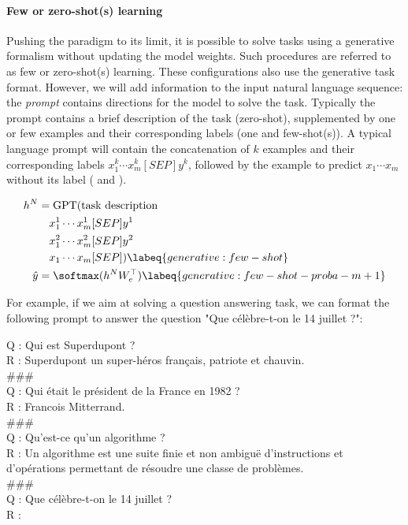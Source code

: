 \paragraph{Few or zero-shot(s) learning} Pushing the paradigm to its limit, it is possible to solve tasks using a generative formalism without updating the model weights. Such procedures are referred to as few or zero-shot(s) learning. These configurations also use the generative task format. However, we will add information to the input natural language sequence: the \textit{prompt} contains directions for the model to solve the task. Typically the prompt contains a brief description of the task (zero-shot), supplemented by one or few examples and their corresponding labels (one and few-shot(s)). A typical language prompt will contain the concatenation of $k$ examples and their corresponding labels $x^k_1 \cdots x^k_m [SEP] y^k$, followed by the example to predict $x_1 \cdots x_m$ without its label ( and ).

\begin{align}
    h^N &= \textrm{GPT}(\textrm{task description} \nonumber \\
    & \quad x^1_1 \cdots x^1_m [SEP] y^1 \nonumber \\
    & \quad x^2_1 \cdots x^2_m [SEP] y^2 \nonumber \\
    & \quad x_1 \cdots x_m [SEP]) \labeq{generative:few-shot}\\
    \hat{y} &= \softmax(h^N W_e^{\top}) \labeq{generative:few-shot-proba-m+1}
\end{align}

For example, if we aim at solving a question answering task, we can format the following prompt to answer the question "Que célèbre-t-on le 14 juillet ?": 

Q : Qui est Superdupont ?\\
R : Superdupont un super-héros français, patriote et chauvin.\\
\#\#\#\\
Q : Qui était le président de la France en 1982 ?\\
R : Francois Mitterrand.\\
\#\#\#\\
Q : Qu'est-ce qu'un algorithme ?\\
R : Un algorithme est une suite finie et non ambiguë d'instructions et d’opérations permettant de résoudre une classe de problèmes.\\
\#\#\#\\
Q : Que célèbre-t-on le 14 juillet ?\\
R :

